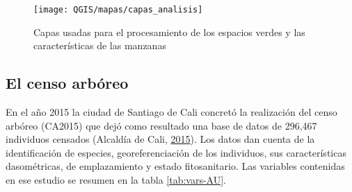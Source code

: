 \documentclass[12pt,a4paper,openany]{book}
\theoremstyle{definition}
\theoremstyle{definition}
\theoremstyle{definition}
\theoremstyle{remark}
\begin{document}
\begin{figure}

{\centering \texttt{[image: QGIS/mapas/capas\_analisis]} 

}

\caption{Capas usadas para el procesamiento de los espacios verdes y las características de las manzanas}\label{fig:capas-idesc}
\end{figure}

\subsection{El censo arbóreo}\label{el-censo-arboreo}

En el año 2015 la ciudad de Santiago de Cali concretó la realización del
censo arbóreo (CA2015) que dejó como resultado una base de datos de
296,467 individuos censados (Alcaldía de Cali,
\protect\hyperlink{ref-ca2015cali}{2015}). Los datos dan cuenta de la
identificación de especies, georeferenciación de los individuos, sus
características dasométricas, de emplazamiento y estado fitosanitario.
Las variables contenidas en ese estudio se resumen en la tabla
\ref{tab:vars-AU}.
\end{document}
